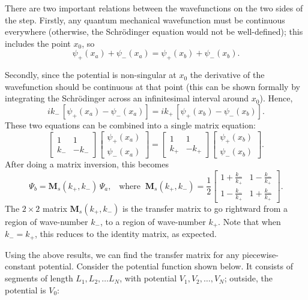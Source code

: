 \documentclass[pra,12pt]{revtex4}
\begin{document}
There are two important relations between the wavefunctions on the two
sides of the step.  Firstly, any quantum mechanical wavefunction must
be continuous everywhere (otherwise, the Schr\"odinger equation would
not be well-defined); this includes the point $x_0$, so
\begin{equation}
  \psi_+(x_a) + \psi_-(x_a) = \psi_+(x_b) + \psi_-(x_b).
\end{equation}

Secondly, since the potential is non-singular at $x_0$ the derivative
of the wavefunction should be continuous at that point (this can be
shown formally by integrating the Schr\"odinger across an
infinitesimal interval around $x_0$).  Hence,
\begin{equation}
  ik_-\, \left[\psi_+(x_a) - \psi_-(x_a)\right] = ik_+\, \left[\psi_+(x_b) - \psi_-(x_b)\right].
\end{equation}
These two equations can be combined into a single matrix equation:
\begin{equation}
  \begin{bmatrix}1 & 1 \\ k_- & - k_-\end{bmatrix}\begin{bmatrix}\psi_+(x_a) \\ \psi_-(x_a) \end{bmatrix} = \begin{bmatrix}1 & 1 \\ k_+ & - k_+\end{bmatrix} \begin{bmatrix}\psi_+(x_b) \\ \psi_-(x_b) \end{bmatrix}.
\end{equation}
After doing a matrix inversion, this becomes
\begin{equation}
  \Psi_b = \mathbf{M}_s(k_+,k_-) \, \Psi_a, \;\;\;\mathrm{where}\;\; \mathbf{M}_s(k_+,k_-) = \frac{1}{2} \begin{bmatrix}1+\frac{k_-}{k_+} & 1-\frac{k_-}{k_+} \\ 1-\frac{k_-}{k_+} & 1+\frac{k_-}{k_+}\end{bmatrix}.
\end{equation}
The $2\times2$ matrix $\mathbf{M}_s(k_+,k_-)$ is the transfer matrix
to go rightward from a region of wave-number $k_-$, to a region of
wave-number $k_+$.  Note that when $k_- = k_+$, this reduces to the
identity matrix, as expected.

Using the above results, we can find the transfer matrix for any
piecewise-constant potential.  Consider the potential function shown
below.  It consists of segments of length $L_1, L_2, \dots L_N$, with
potential $V_1, V_2, \dots, V_N$; outside, the potential is $V_0$:
\end{document}
